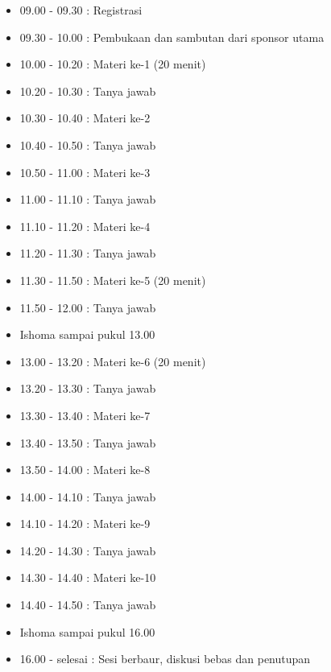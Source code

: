 \documentclass{article}
\begin{document}
\begin{itemize}
  \item 09.00 - 09.30 : Registrasi
  \item 09.30 - 10.00 : Pembukaan dan sambutan dari sponsor utama
  \item 10.00 - 10.20 : Materi ke-1 (20 menit)
  \item 10.20 - 10.30 : Tanya jawab
  \item 10.30 - 10.40 : Materi ke-2 
  \item 10.40 - 10.50 : Tanya jawab
  \item 10.50 - 11.00 : Materi ke-3
  \item 11.00 - 11.10 : Tanya jawab
  \item 11.10 - 11.20 : Materi ke-4
  \item 11.20 - 11.30 : Tanya jawab
  \item 11.30 - 11.50 : Materi ke-5 (20 menit)
  \item 11.50 - 12.00 : Tanya jawab
  \item Ishoma sampai pukul 13.00
  \item 13.00 - 13.20 : Materi ke-6 (20 menit)
  \item 13.20 - 13.30 : Tanya jawab
  \item 13.30 - 13.40 : Materi ke-7
  \item 13.40 - 13.50 : Tanya jawab
  \item 13.50 - 14.00 : Materi ke-8
  \item 14.00 - 14.10 : Tanya jawab
  \item 14.10 - 14.20 : Materi ke-9
  \item 14.20 - 14.30 : Tanya jawab
  \item 14.30 - 14.40 : Materi ke-10
  \item 14.40 - 14.50 : Tanya jawab
  \item Ishoma sampai pukul 16.00
  \item 16.00 - selesai : Sesi berbaur, diskusi bebas dan penutupan
\end{itemize}
\end{document}
